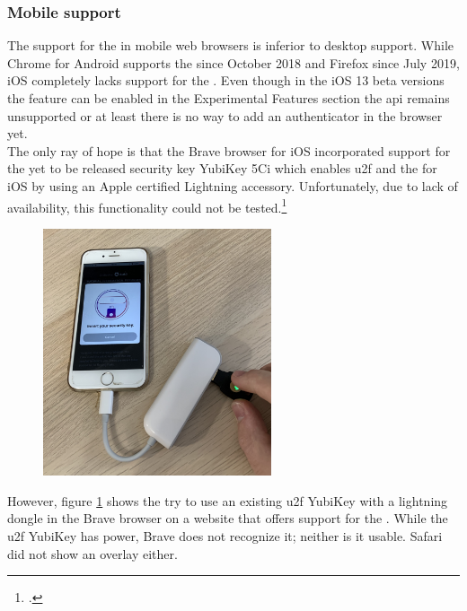 \subsubsection{Mobile support}

The support for the \wa{} in mobile web browsers is inferior to desktop support. While Chrome for Android supports the \wa{} since October 2018 and Firefox since July 2019, iOS completely lacks support for the \wa. Even though in the iOS 13 beta versions the feature can be enabled in the \frqq Experimental Features\flqq{} section the \gls{api} remains unsupported or at least there is no way to add an authenticator in the browser yet.\\
The only ray of hope is that the Brave browser for iOS incorporated support for the yet to be released security key \frqq YubiKey 5Ci\flqq{} which enables \gls{u2f} and the \wa{} for iOS by using an Apple certified Lightning accessory. Unfortunately, due to lack of availability, this functionality could not be tested.\footcites[See][]{brave-ios}[See][]{brave-now-available}
\\

\begin{figure}[hbt]
	\centering
	\includegraphics[width=0.6\textwidth]{pics/brave_try_dongle.jpg}
	\caption{}
	\label{fig:bave_try}
\end{figure}

However, figure \ref{fig:bave_try} shows the try to use an existing \gls{u2f} YubiKey with a lightning dongle in the Brave browser on a website that offers support for the \wa. While the \gls{u2f} YubiKey has power, Brave does not recognize it; neither is it usable. Safari did not show an overlay either.

